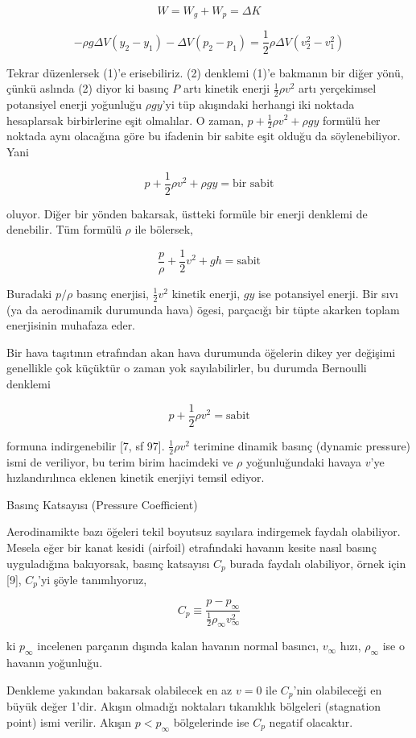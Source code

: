 \documentclass[12pt,fleqn]{article}\usepackage{../../common}
\begin{document}
$$
W = W_g + W_p = \Delta K
$$

$$
-\rho g \Delta V(y_2-y_1) - \Delta V(p_2-p_1) = 
\frac{1}{2} \rho \Delta V(v_2^2 - v_1^2)
$$

Tekrar düzenlersek (1)'e erisebiliriz. (2) denklemi (1)'e bakmanın bir
diğer yönü, çünkü aslında (2) diyor ki basınç $P$ artı kinetik enerji
$\frac{1}{2} \rho v^2$ artı yerçekimsel potansiyel enerji yoğunluğu
$\rho g y$'yi tüp akışındaki herhangi iki noktada hesaplarsak birbirlerine
eşit olmalılar. O zaman, $p + \frac{1}{2} \rho v^2 + \rho g y$ formülü her
noktada aynı olacağına göre bu ifadenin bir sabite eşit olduğu da
söylenebiliyor. Yani

$$
p + \frac{1}{2} \rho v^2 + \rho g y = \textrm{bir sabit}
$$

oluyor. Diğer bir yönden bakarsak, üstteki formüle bir enerji denklemi de
denebilir. Tüm formülü $\rho$ ile bölersek,

$$
\frac{p}{\rho} + \frac{1}{2} v^2 + gh = \textrm{sabit}
$$

Buradaki $p / \rho$ basınç enerjisi, $\frac{1}{2}v^2$ kinetik enerji, $gy$ ise
potansiyel enerji. Bir sıvı (ya da aerodinamik durumunda hava) ögesi, parçacığı
bir tüpte akarken toplam enerjisinin muhafaza eder.

Bir hava taşıtının etrafından akan hava durumunda öğelerin dikey yer
değişimi genellikle çok küçüktür o zaman yok sayılabilirler, bu durumda
Bernoulli denklemi 

$$
p + \frac{1}{2} \rho v^2 = \textrm{sabit}
$$

formuna indirgenebilir [7, sf 97]. $\frac{1}{2}\rho v^2$ terimine dinamik basınç
(dynamic pressure) ismi de veriliyor, bu terim birim hacimdeki ve $\rho$
yoğunluğundaki havaya $v$'ye hızlandırılınca eklenen kinetik enerjiyi temsil ediyor.

Basınç Katsayısı (Pressure Coefficient)

Aerodinamikte bazı öğeleri tekil boyutsuz sayılara indirgemek faydalı
olabiliyor. Mesela eğer bir kanat kesidi (airfoil) etrafındaki havanın kesite
nasıl basınç uyguladığına bakıyorsak, basınç katsayısı $C_p$ burada faydalı
olabiliyor, örnek için [9], $C_p$'yi şöyle tanımlıyoruz,

$$
C_p \equiv \frac{p - p_\infty}{\frac{1}{2} \rho_\infty v_\infty^2}
$$

ki $p_\infty$ incelenen parçanın dışında kalan havanın normal basıncı,
$v_\infty$ hızı, $\rho_\infty$ ise o havanın yoğunluğu.

Denkleme yakından bakarsak olabilecek en az $v=0$ ile $C_p$'nin olabileceği en
büyük değer 1'dir. Akışın olmadığı noktaları tıkanıklık bölgeleri (stagnation
point) ismi verilir. Akışın $p < p_\infty$ bölgelerinde ise $C_p$ negatif
olacaktır.
\end{document}
